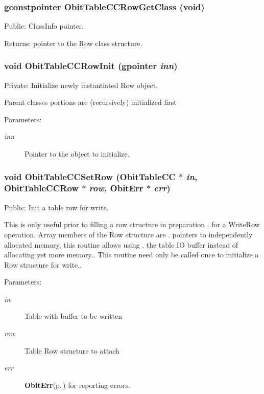 \subsubsection{\setlength{\rightskip}{0pt plus 5cm}gconstpointer Obit\-Table\-CCRow\-Get\-Class (void)}\label{ObitTableCC_8c_a15}


Public: Class\-Info pointer. 

\begin{Desc}
\item[Returns:]pointer to the Row class structure. \end{Desc}
\subsubsection{\setlength{\rightskip}{0pt plus 5cm}void Obit\-Table\-CCRow\-Init (gpointer {\em inn})}\label{ObitTableCC_8c_a6}


Private: Initialize newly instantiated Row object. 

Parent classes portions are (recursively) initialized first \begin{Desc}
\item[Parameters:]
\begin{description}
\item[{\em inn}]Pointer to the object to initialize. \end{description}
\end{Desc}
\subsubsection{\setlength{\rightskip}{0pt plus 5cm}void Obit\-Table\-CCSet\-Row ({\bf Obit\-Table\-CC} $\ast$ {\em in}, {\bf Obit\-Table\-CCRow} $\ast$ {\em row}, {\bf Obit\-Err} $\ast$ {\em err})}\label{ObitTableCC_8c_a23}


Public: Init a table row for write. 

This is only useful prior to filling a row structure in preparation . for a Write\-Row operation. Array members of the Row structure are . pointers to independently allocated memory, this routine allows using . the table IO buffer instead of allocating yet more memory.. This routine need only be called once to initialize a Row structure for write.. \begin{Desc}
\item[Parameters:]
\begin{description}
\item[{\em in}]Table with buffer to be written \item[{\em row}]Table Row structure to attach \item[{\em err}]{\bf Obit\-Err}{\rm (p.\,\pageref{structObitErr})} for reporting errors. \end{description}
\end{Desc}
